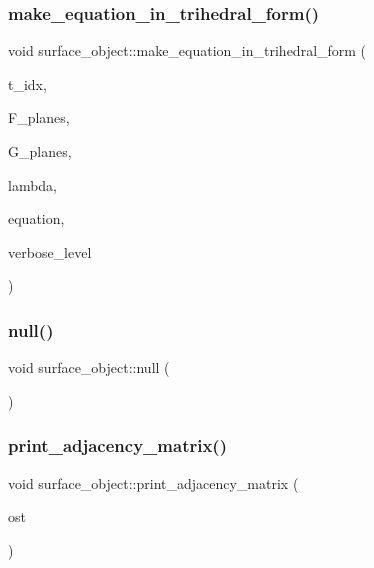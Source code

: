 \subsubsection{\texorpdfstring{make\+\_\+equation\+\_\+in\+\_\+trihedral\+\_\+form()}{make\_equation\_in\_trihedral\_form()}}
{\footnotesize\ttfamily void surface\+\_\+object\+::make\+\_\+equation\+\_\+in\+\_\+trihedral\+\_\+form (\begin{DoxyParamCaption}\item[{\mbox{\hyperlink{galois_8h_a09fddde158a3a20bd2dcadb609de11dc}{I\+NT}}}]{t\+\_\+idx,  }\item[{\mbox{\hyperlink{galois_8h_a09fddde158a3a20bd2dcadb609de11dc}{I\+NT}} $\ast$}]{F\+\_\+planes,  }\item[{\mbox{\hyperlink{galois_8h_a09fddde158a3a20bd2dcadb609de11dc}{I\+NT}} $\ast$}]{G\+\_\+planes,  }\item[{\mbox{\hyperlink{galois_8h_a09fddde158a3a20bd2dcadb609de11dc}{I\+NT}} \&}]{lambda,  }\item[{\mbox{\hyperlink{galois_8h_a09fddde158a3a20bd2dcadb609de11dc}{I\+NT}} $\ast$}]{equation,  }\item[{\mbox{\hyperlink{galois_8h_a09fddde158a3a20bd2dcadb609de11dc}{I\+NT}}}]{verbose\+\_\+level }\end{DoxyParamCaption})}

\mbox{\label{classsurface__object_a8252a4bafc5b472c16387da74e1f9d0a}} 
\subsubsection{\texorpdfstring{null()}{null()}}
{\footnotesize\ttfamily void surface\+\_\+object\+::null (\begin{DoxyParamCaption}{ }\end{DoxyParamCaption})}

\mbox{\label{classsurface__object_a559eff30b652887fdcfecb2f13f3718f}} 
\subsubsection{\texorpdfstring{print\+\_\+adjacency\+\_\+matrix()}{print\_adjacency\_matrix()}}
{\footnotesize\ttfamily void surface\+\_\+object\+::print\+\_\+adjacency\+\_\+matrix (\begin{DoxyParamCaption}\item[{ostream \&}]{ost }\end{DoxyParamCaption})}


